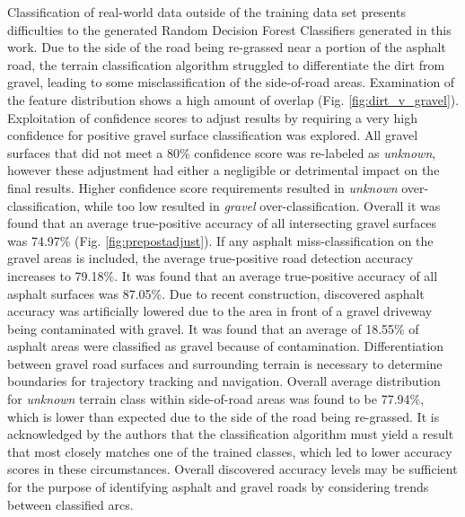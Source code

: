 \documentclass[journal,onecolumn]{IEEEtran}
\begin{document}
		{Classification of real-world data outside of the training data set presents difficulties to the generated Random Decision Forest Classifiers generated in this work. Due to the side of the road being re-grassed near a portion of the asphalt road, the terrain classification algorithm struggled to differentiate the dirt from gravel, leading to some misclassification of the side-of-road areas. Examination of the feature distribution shows a high amount of overlap (Fig. \ref{fig:dirt_v_gravel}). Exploitation of confidence scores to adjust results by requiring a very high confidence for positive gravel surface classification was explored. All gravel surfaces that did not meet a 80\% confidence score was re-labeled as \textit{unknown}, however these adjustment had either a negligible or detrimental impact on the final results. Higher confidence score requirements resulted in \textit{unknown} over-classification, while too low resulted in \textit{gravel} over-classification. Overall it was found that an average true-positive accuracy of all intersecting gravel surfaces was 74.97\% (Fig. \ref{fig:prepostadjust}). If any asphalt miss-classification on the gravel areas is included, the average true-positive road detection accuracy increases to 79.18\%. It was found that an average true-positive accuracy of all asphalt surfaces was 87.05\%. Due to recent construction, discovered asphalt accuracy was artificially lowered due to the area in front of a gravel driveway being contaminated with gravel. It was found that an average of 18.55\% of asphalt areas were classified as gravel because of contamination. Differentiation between gravel road surfaces and surrounding terrain is necessary to determine boundaries for trajectory tracking and navigation. Overall average distribution for \textit{unknown} terrain class within side-of-road areas was found to be 77.94\%, which is lower than expected due to the side of the road being re-grassed. It is acknowledged by the authors that the classification algorithm must yield a result that most closely matches one of the trained classes, which led to lower accuracy scores in these circumstances. Overall discovered accuracy levels may be sufficient for the purpose of identifying asphalt and gravel roads by considering trends between classified arcs.}
		
\end{document}
